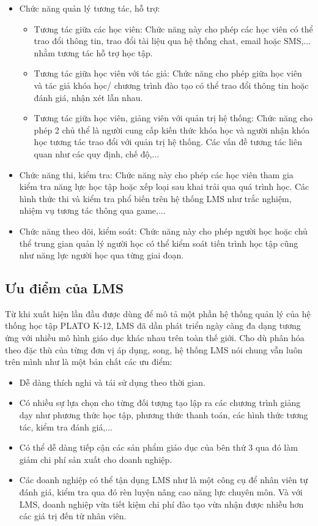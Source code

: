 \begin{itemize}
	\item Chức năng quản lý tương tác, hỗ trợ:
	\begin{itemize}
		\item Tương tác giữa các học viên: Chức năng này cho phép các học viên có thể trao đổi thông tin, trao đổi tài liệu qua hệ thống chat, email hoặc SMS,... nhằm tương tác hỗ trợ học tập.
		\item Tương tác giữa học viên với tác giả: Chức năng cho phép giữa học viên và tác giả khóa học/ chương trình đào tạo có thể trao đổi thông tin hoặc đánh giá, nhận xét lẫn nhau.
		\item Tương tác giữa học viên, giảng viên với quản trị hệ thống: Chức năng cho phép 2 chủ thể là người cung cấp kiến thức khóa học và người nhận khóa học tương tác trao đổi với quản trị hệ thống. Các vấn đề tương tác liên quan như các quy định, chế độ,...
	\end{itemize}
	\item Chức năng thi, kiểm tra: Chức năng này cho phép các học viên tham gia kiểm tra năng lực học tập hoặc xếp loại sau khai trải qua quá trình học. Các hình thức thi và kiểm tra phổ biến trên hệ thống LMS như trắc nghiệm, nhiệm vụ tương tác thông qua game,...
	\item Chức năng theo dõi, kiểm soát: Chức năng này cho phép người học hoặc chủ thể trung gian quản lý người học có thể kiểm soát tiến trình học tập cũng như năng lực người học qua từng giai đoạn.
\end{itemize}
\subsection{Ưu điểm của LMS}
Từ khi xuất hiện lần đầu được dùng để mô tả một phần hệ thống quản lý của hệ thống học tập PLATO K-12, LMS đã dần phát triển ngày càng đa dạng tương ứng với nhiều mô hình giáo dục khác nhau trên toàn thế giới. Cho dù phân hóa theo đặc thù của từng đơn vị áp dụng, song, hệ thống LMS nói chung vẫn luôn trên mình như là một bản chất các ưu điểm:
\begin{itemize}
	\item Dễ dàng thích nghi và tái sử dụng theo thời gian.
	\item Có nhiều sự lựa chọn cho từng đối tượng tạo lập ra các chương trình giảng dạy như phương thức học tập, phương thức thanh toán, các hình thức tương tác, kiểm tra đánh giá,...
	\item Có thể dễ dàng tiếp cận các sản phẩm giáo dục của bên thứ 3 qua đó làm giảm chi phí sản xuất cho doanh nghiệp.
	\item Các doanh nghiệp có thể tận dụng LMS như là một công cụ để nhân viên tự đánh giá, kiểm tra qua đó rèn luyện nâng cao năng lực chuyên môn. Và với LMS, doanh nghiệp vừa tiết kiệm chi phí đào tạo vừa nhận được nhiều hơn các giá trị đến từ nhân viên.
\end{itemize}

